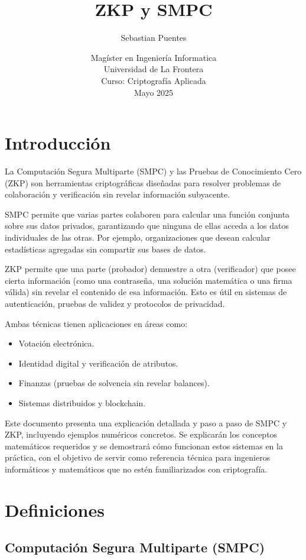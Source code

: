 \documentclass{article}
\title{ZKP y SMPC}
\author{Sebastian Puentes}
\date{Magíster en Ingeniería Informatica \\ Universidad de La Frontera \\ Curso: Criptografía Aplicada \\ Mayo 2025}
\begin{document}
\sloppy
\maketitle

\section{Introducción}

La Computación Segura Multiparte (SMPC) y las Pruebas de Conocimiento Cero (ZKP) son herramientas criptográficas diseñadas para resolver problemas de colaboración y verificación sin revelar información subyacente.

SMPC permite que varias partes colaboren para calcular una función conjunta sobre sus datos privados, garantizando que ninguna de ellas acceda a los datos individuales de las otras. Por ejemplo, organizaciones que desean calcular estadísticas agregadas sin compartir sus bases de datos.

ZKP permite que una parte (probador) demuestre a otra (verificador) que posee cierta información (como una contraseña, una solución matemática o una firma válida) sin revelar el contenido de esa información. Esto es útil en sistemas de autenticación, pruebas de validez y protocolos de privacidad.

Ambas técnicas tienen aplicaciones en áreas como:
\begin{itemize}
    \item Votación electrónica.
    \item Identidad digital y verificación de atributos.
    \item Finanzas (pruebas de solvencia sin revelar balances).
    \item Sistemas distribuidos y blockchain.
\end{itemize}

Este documento presenta una explicación detallada y paso a paso de SMPC y ZKP, incluyendo ejemplos numéricos concretos. Se explicarán los conceptos matemáticos requeridos y se demostrará cómo funcionan estos sistemas en la práctica, con el objetivo de servir como referencia técnica para ingenieros informáticos y matemáticos que no estén familiarizados con criptografía.

\section{Definiciones}

\subsection{Computación Segura Multiparte (SMPC)}
\end{document}
